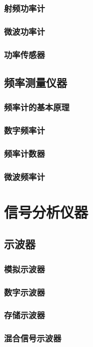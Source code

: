\documentclass[12pt,UTF8]{ctexbook}
\begin{document}
\section{射频功率计}
\section{微波功率计}
\section{功率传感器}

\chapter{频率测量仪器}
\section{频率计的基本原理}
\section{数字频率计}
\section{频率计数器}
\section{微波频率计}

\part{信号分析仪器}

\chapter{示波器}
\section{模拟示波器}
\section{数字示波器}
\section{存储示波器}
\section{混合信号示波器}
\end{document}
